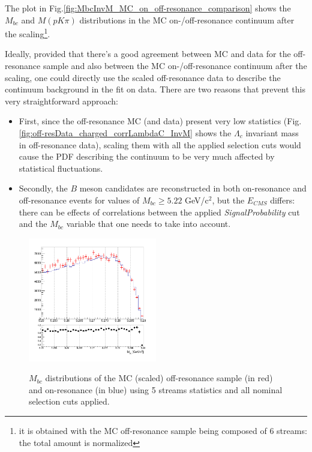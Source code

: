 \noindent The plot in Fig.\ref{fig:MbcInvM_MC_on_off-resonance_comparison} shows the $M_{bc}$ and $M(p K \pi)$ distributions in the MC on-/off-resonance continuum after the scaling\footnote{it is obtained with the MC off-resonance sample being composed of 6 streams: the total amount is normalized}.

Ideally, provided that there's a good agreement between MC and data for the off-resonance sample and also between the MC  on-/off-resonance continuum after the scaling, one could directly use the scaled off-resonance data to describe the continuum background in the fit on data. There are two reasons that prevent this very straightforward approach:
\begin{itemize}

\item First, since the off-resonance MC (and data) present very low statistics (Fig. \ref{fig:off-resData_charged_corrLambdaC_InvM} shows the  $\Lambda_c$ 
invariant mass in off-resonance data), scaling them with all the applied selection cuts would cause the PDF describing the continuum to be very much affected by statistical fluctuations. 
\item Secondly, the $B$ meson candidates are reconstructed in both on-resonance and off-resonance events for values of $M_{bc} \geq 5.22 $ GeV/c$^2$, but the $E_{CMS}$ differs: there can be effects of correlations between the applied \textit{SignalProbability} cut and the $M_{bc}$ variable that one needs to take into account. %
\end{itemize}

\begin{figure}[H]
{\includegraphics[width=0.5\textwidth]{04-chargedCorrBtoLambda/figs/stream01234_Mbc_continuumRescaling.png}}
\caption{$M_{bc}$ distributions of the MC (scaled) off-resonance sample (in red) and on-resonance (in blue) using 5 streams statistics and all nominal selection cuts applied.}
\label{fig:charged_corrLambdaC_Mbc_on_offResScaled}
\end{figure}



